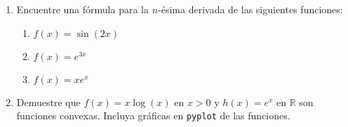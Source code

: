 \documentclass[12pt, a4paper]{article}
\begin{document}
\begin{enumerate}
\begin{enumerate}
\end{enumerate}

\item Encuentre una fórmula para la $n$-\'esima derivada de las siguientes funciones:
\begin{enumerate}
\item $f(x)=\sin(2x)$
\item $f(x)=e^{3x}$
\item $f(x)=xe^{x}$
\end{enumerate}

\item Demuestre que $f(x)=x\log(x)$ en $x>0$ y $h(x)=e^x$ en $\mathbb{R}$ son funciones convexas. Incluya gráficas en \verb!pyplot! de las funciones.
\end{enumerate}
\end{document}
